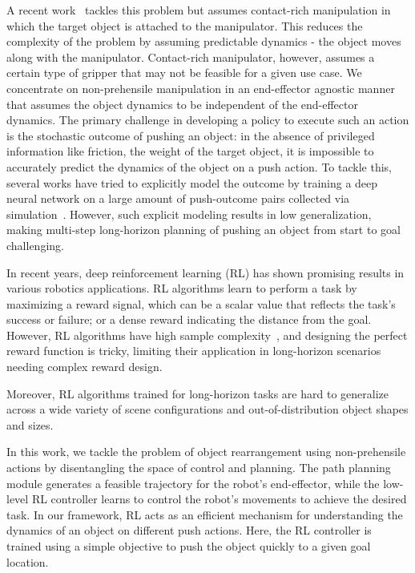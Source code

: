 A recent work~\cite{iros2022} tackles this problem but assumes contact-rich manipulation in which the target object is attached to the manipulator. This reduces the complexity of the problem by assuming predictable dynamics - the object moves along with the manipulator. Contact-rich manipulator, however, assumes a certain type of gripper that may not be feasible for a given use case.  We concentrate on non-prehensile manipulation in an end-effector agnostic manner that assumes the object dynamics to be independent of the end-effector dynamics. The primary challenge in developing a policy to execute such an action is the stochastic outcome of pushing an object: in the absence of privileged information like friction, the weight of the target object, it is impossible to accurately predict the dynamics of the object on a push action. To tackle this, several works have tried to explicitly model the outcome by training a deep neural network on a large amount of push-outcome pairs collected via simulation~\cite{huang2021dipn, huang2021visual, bai2021hierarchical-more}. However, such explicit modeling results in low generalization, making multi-step long-horizon planning of pushing an object from start to goal challenging. 

In recent years, deep reinforcement learning (RL) has shown promising results in various robotics applications. RL algorithms learn to perform a task by maximizing a reward signal, which can be a scalar value that reflects the task's success or failure; or a dense reward indicating the distance from the goal. However, RL algorithms have high sample complexity~\cite{rl_sample_complexitiy}, and designing the perfect reward function is tricky, limiting their application in long-horizon scenarios~\cite{rl_long_horizon} needing complex reward design. 

Moreover, RL algorithms trained for long-horizon tasks are hard to generalize across a wide variety of scene configurations and out-of-distribution object shapes and sizes.

In this work, we tackle the problem of object rearrangement using non-prehensile actions by disentangling the space of control and planning. The path planning module generates a feasible trajectory for the robot's end-effector, while the low-level RL controller learns to control the robot's movements to achieve the desired task. In our framework, RL acts as an efficient mechanism for understanding the dynamics of an object on different push actions. Here, the RL controller is trained using a simple objective to push the object quickly to a given goal location. 

